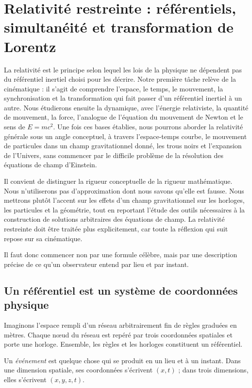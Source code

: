 \chapter{Relativité restreinte : référentiels, simultanéité et transformation de Lorentz}

La relativité est le principe selon lequel les lois de la physique ne dépendent pas du référentiel inertiel choisi pour les décrire. Notre première tâche relève de la cinématique : il s’agit de comprendre l’espace, le temps, le mouvement, la synchronisation et la transformation qui fait passer d’un référentiel inertiel à un autre. Nous étudierons ensuite la dynamique, avec l’énergie relativiste, la quantité de mouvement, la force, l’analogue de l’équation du mouvement de Newton et le sens de \(E=mc^2\). Une fois ces bases établies, nous pourrons aborder la relativité générale sous un angle conceptuel, à travers l’espace-temps courbe, le mouvement de particules dans un champ gravitationnel donné, les trous noirs et l’expansion de l’Univers, sans commencer par le difficile problème de la résolution des équations de champ d’Einstein.

Il convient de distinguer la rigueur conceptuelle de la rigueur mathématique. Nous n’utiliserons pas d’approximation dont nous savons qu’elle est fausse. Nous mettrons plutôt l’accent sur les effets d’un champ gravitationnel sur les horloges, les particules et la géométrie, tout en reportant l’étude des outils nécessaires à la construction de solutions arbitraires des équations de champ. La relativité restreinte doit être traitée plus explicitement, car toute la réflexion qui suit repose sur sa cinématique.

Il faut donc commencer non par une formule célèbre, mais par une description précise de ce qu’un observateur entend par lieu et par instant.

\section{Un référentiel est un système de coordonnées physique}

Imaginons l’espace rempli d’un réseau arbitrairement fin de règles graduées en mètres. Chaque nœud du réseau est repéré par trois coordonnées spatiales et porte une horloge. Ensemble, les règles et les horloges constituent un référentiel.

\begin{definition}Un \emph{événement} est quelque chose qui se produit en un lieu et à un instant. Dans une dimension spatiale, ses coordonnées s’écrivent \((x,t)\) ; dans trois dimensions, elles s’écrivent \((x,y,z,t)\).\end{definition}

